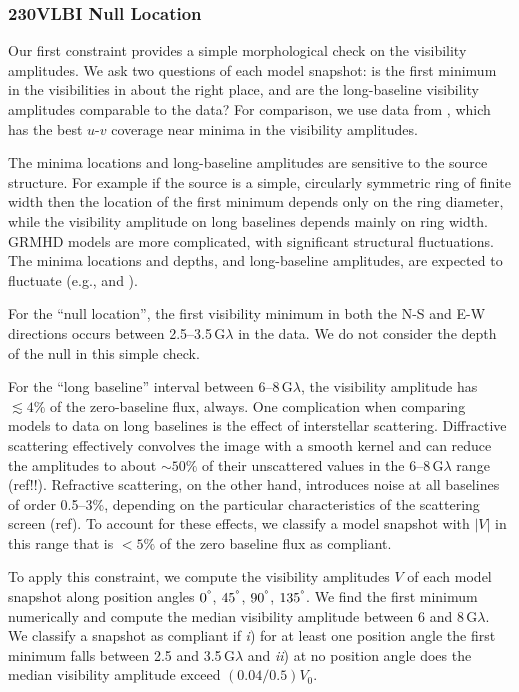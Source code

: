 \subsubsection{230\GHz VLBI Null Location}

Our first constraint provides a simple morphological check on the visibility amplitudes.
We ask two questions of each model snapshot: is the first minimum in the visibilities in about the right place,
and are the long-baseline visibility amplitudes comparable to the data?
For comparison, we use data from \aprilvii, which has the best $u$-$v$ coverage near minima in the visibility amplitudes.

The minima locations and long-baseline amplitudes are sensitive to the source structure.
For example if the source is a simple, circularly symmetric ring of finite width then the location of the first minimum depends only on the ring diameter, while the visibility amplitude on long baselines depends mainly on ring width.
GRMHD models are more complicated, with significant structural fluctuations.
The minima locations and depths, and long-baseline amplitudes, are expected to fluctuate (e.g., \citealt{2018ApJ...856..163M} and ).

For the ``null location'', the first visibility minimum in both the N-S and E-W directions occurs between 2.5--3.5\,G$\lambda$ in the data.
We do not consider the depth of the null in this simple check.

For the ``long baseline'' interval between 6--8\,G$\lambda$, the visibility amplitude has $\lesssim 4\%$ of the zero-baseline flux, always.
One complication when comparing models to data on long baselines is the effect of interstellar scattering.
Diffractive scattering effectively convolves the image with a smooth kernel and can reduce the amplitudes to about $\sim 50\%$ of their unscattered values in the 6--8\,G$\lambda$ range (ref!!).
Refractive scattering, on the other hand, introduces noise at all baselines of order 0.5--3\%, depending on the particular characteristics of the scattering screen (ref).  To account for these effects, we classify a model snapshot with $|V|$ in this range that is $< 5\%$ of the zero baseline flux as compliant.

To apply this constraint, we compute the visibility amplitudes $V$ of each model snapshot along position angles $0^\degree$, $45^\degree$, $90^\degree$, $135^\degree$.  We find the first minimum numerically and compute the median visibility amplitude between 6 and 8\,G$\lambda$.
We classify a snapshot as compliant if \emph{i}) for at least one position angle the first minimum falls between 2.5 and 3.5\,G$\lambda$ and \emph{ii}) at no position angle does the median visibility amplitude exceed $(0.04 / 0.5) V_0$.

